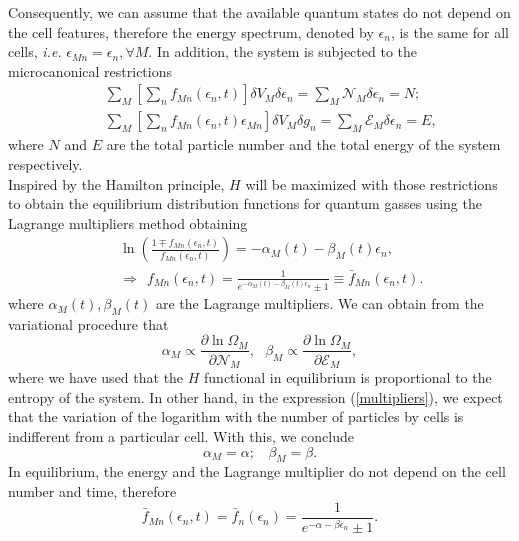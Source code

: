 \documentclass{article}
\begin{document}
Consequently, we can assume that the available quantum states do not depend on the cell features,
therefore the energy spectrum, denoted by $\epsilon_n$, is the same for all cells, \textit{i.e.} $\epsilon_{Mn} = \epsilon_n, \forall M$. In addition, the system is subjected to the microcanonical restrictions
\begin{eqnarray}
    &&\sum_{M} \left[ \sum_{n}f_{Mn}(\epsilon_{n} ,t)\right]\delta V_M \delta \epsilon_n=\sum_{M} {\mathcal{N}}_{M} \delta \epsilon_n=N; \nonumber \\
    &&\sum_{M}\left[ \sum_{n}f_{Mn}(\epsilon_{n},t)\epsilon_{Mn}\right]\delta V_M \delta g_n=\sum_M {\mathcal{E}}_M \delta \epsilon_n=E, \label{restriccions1}
\end{eqnarray}
where $N$ and $E$ are the total particle number and the total energy of the system respectively.\\ 
Inspired by the Hamilton principle, $H$ will be maximized with those restrictions to obtain the equilibrium distribution functions for quantum gasses using the Lagrange multipliers method obtaining
\begin{eqnarray}
&&\ln \left(\frac{1\mp f_{Mn}(\epsilon_{n},t)}{f_{Mn}(\epsilon_{n},t)} \right)=-\alpha_M(t)-\beta_M(t) \epsilon_{n}, \label{relation}\\ &&\Rightarrow \ \ f_{Mn}(\epsilon_{n},t)=\frac{1}{e^{-\alpha_M(t)-\beta_M(t) \epsilon_{n}}\pm 1} \equiv \bar{f}_{Mn}(\epsilon_{n},t) \label{distributionequilibrium}.
\end{eqnarray}
where $\alpha_M(t), \beta_M(t)$ are the Lagrange multipliers. We can obtain from the variational procedure that 
\begin{equation}
    \alpha_M\propto \frac{\partial \ln \Omega_M}{\partial \mathcal{N}_M}, \ \ \ \beta_M\propto \frac{\partial \ln \Omega_M}{\partial \mathcal{E}_M},\label{multipliers}
\end{equation}
where we have used that the $H$ functional in equilibrium is proportional to the entropy of the system.
In other hand, in the expression (\ref{multipliers}), we expect that the variation of the logarithm with the number of particles by cells is indifferent from a particular cell. With this, we conclude  
\begin{equation}
    \alpha_M=\alpha; \ \ \ \ \beta_M=\beta.
\end{equation}
In equilibrium, the energy and the Lagrange multiplier do not depend on the cell number and time, therefore
\begin{equation}
    \bar f_{Mn}(\epsilon_{n},t)=\bar f_n(\epsilon_{n}) =\frac{1}{e^{-\alpha-\beta \epsilon_n}\pm 1}.
\end{equation}{}
\end{document}

